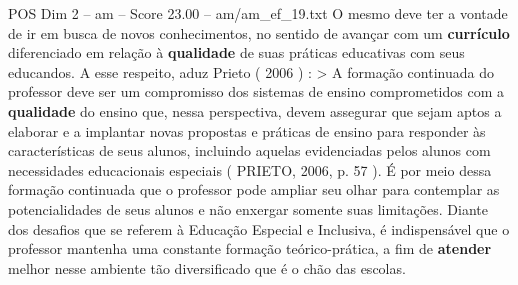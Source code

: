 \begin{textsample}{POS Dim 2 – am – Score 23.00 – am/am\_ef\_19.txt}
O mesmo deve ter a vontade de ir em busca de novos conhecimentos, no sentido de avançar com um \textbf{currículo} diferenciado em relação à \textbf{qualidade} de suas práticas educativas com seus educandos.
A esse respeito, aduz Prieto ( 2006 ) : > A formação continuada do professor deve ser um compromisso dos sistemas de ensino comprometidos com a \textbf{qualidade} do ensino que, nessa perspectiva, devem assegurar que sejam aptos a elaborar e a implantar novas propostas e práticas de ensino para responder às características de seus alunos, incluindo aquelas evidenciadas pelos alunos com necessidades educacionais especiais ( PRIETO, 2006, p. 57 ).
É por meio dessa formação continuada que o professor pode ampliar seu olhar para contemplar as potencialidades de seus alunos e não enxergar somente suas limitações.
Diante dos desafios que se referem à Educação Especial e Inclusiva, é indispensável que o professor mantenha uma constante formação teórico-prática, a fim de \textbf{atender} melhor nesse ambiente tão diversificado que é o chão das escolas.

\end{textsample}
